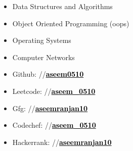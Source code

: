 
\begin{itemize}
\item {\small Data Structures and Algorithms}
\item {\small Object Oriented Programming (oops)}
\item {\small Operating Systems}
\item {\small Computer Networks}
\end{itemize}



\begin{itemize}

\item {\small Github: //\textbf{\href{https://github.com/aseem0510}{\textcolor{black}{aseem0510}}}}
\item {\small Leetcode: //\textbf{\href{https://leetcode.com/aseem_0510/}{\textcolor{black}{aseem\_0510}}}}
\item {\small Gfg: //\textbf{\href{https://auth.geeksforgeeks.org/user/aseemranjan10}{\textcolor{black}{aseemranjan10}}}}
\item {\small Codechef: //\textbf{\href{https://www.codechef.com/users/aseem_0510}{\textcolor{black}{aseem\_0510}}}}
\item {\small Hackerrank: //\textbf{\href{https://www.hackerrank.com/aseemranjan10}{\textcolor{black}{aseemranjan10}}}}
\end{itemize}




